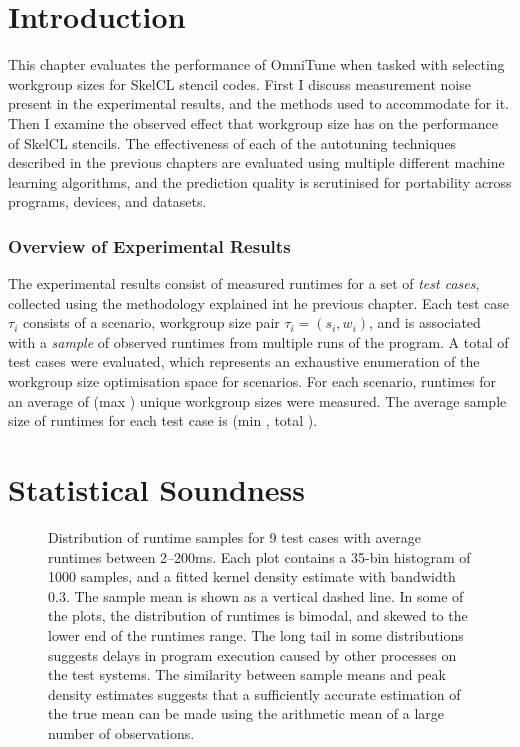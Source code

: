 \section{Introduction}

This chapter evaluates the performance of OmniTune when tasked with
selecting workgroup sizes for SkelCL stencil codes. First I discuss
measurement noise present in the experimental results, and the methods
used to accommodate for it. Then I examine the observed effect that
workgroup size has on the performance of SkelCL stencils. The
effectiveness of each of the autotuning techniques described in the
previous chapters are evaluated using multiple different machine
learning algorithms, and the prediction quality is scrutinised for
portability across programs, devices, and datasets.


\subsubsection{Overview of Experimental Results}

The experimental results consist of measured runtimes for a set of
\emph{test cases}, collected using the methodology explained int he
previous chapter. Each test case $\tau_i$ consists of a scenario,
workgroup size pair $\tau_i = (s_i,w_i)$, and is associated with a
\emph{sample} of observed runtimes from multiple runs of the
program. A total of  test cases were
evaluated, which represents an exhaustive enumeration of the workgroup
size optimisation space for  scenarios. For
each scenario, runtimes for an average of 
(max ) unique workgroup sizes were
measured. The average sample size of runtimes for each test case is
 (min , total
).


\section{Statistical Soundness}

\begin{figure}

\caption{%
  Distribution of runtime samples for 9 test cases with average
  runtimes between 2--200ms. Each plot contains a 35-bin histogram of
  1000 samples, and a fitted kernel density estimate with bandwidth
  0.3. The sample mean is shown as a vertical dashed line. In some of
  the plots, the distribution of runtimes is bimodal, and skewed to
  the lower end of the runtimes range. The long tail in some
  distributions suggests delays in program execution caused by other
  processes on the test systems. The similarity between sample means
  and peak density estimates suggests that a sufficiently accurate
  estimation of the true mean can be made using the arithmetic mean of
  a large number of observations.%
}
\label{fig:runtime-histograms}
\end{figure}

